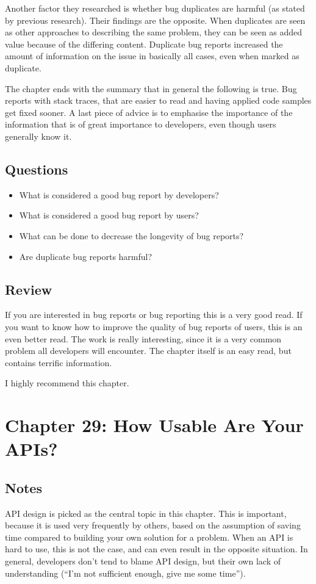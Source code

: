 Another factor they researched is whether bug duplicates are harmful (as stated by previous research). 
Their findings are the opposite. 
When duplicates are seen as other approaches to describing the same problem, they can be seen as added value because of the differing content. 
Duplicate bug reports increased the amount of information on the issue in basically all cases, even when marked as duplicate.

The chapter ends with the summary that in general the following is true.
Bug reports with stack traces, that are easier to read and having applied code samples get fixed sooner.
A last piece of advice is to emphasise the importance of the information that is of great importance to developers, even though users generally know it.

\subsection{Questions}
\begin{itemize}
  \item What is considered a good bug report by developers?
  \item What is considered a good bug report by users?
  \item What can be done to decrease the longevity of bug reports?
  \item Are duplicate bug reports harmful?
\end{itemize}

\subsection{Review}
If you are interested in bug reports or bug reporting this is a very good read. 
If you want to know how to improve the quality of bug reports of users, this is an even better read. 
The work is really interesting, since it is a very common problem all developers will encounter. 
The chapter itself is an easy read, but contains terrific information.

I highly recommend this chapter.

\section{Chapter 29: How Usable Are Your APIs?}
\subsection{Notes}
API design is picked as the central topic in this chapter.
This is important, because it is used very frequently by others, based on the assumption of saving time compared to building your own solution for a problem. 
When an API is hard to use, this is not the case, and can even result in the opposite situation. 
In general, developers don't tend to blame API design, but their own lack of understanding (``I'm not sufficient enough, give me some time'').

